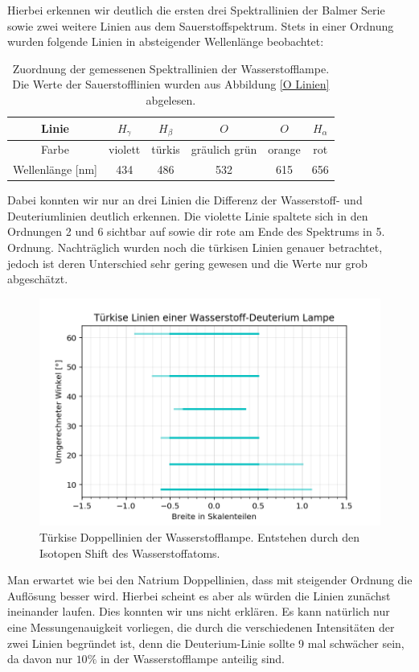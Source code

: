 \documentclass[]{article}
\begin{document}
Hierbei erkennen wir deutlich die ersten drei Spektrallinien der Balmer Serie sowie zwei weitere Linien aus dem Sauerstoffspektrum. Stets in einer Ordnung wurden folgende Linien in absteigender Wellenlänge beobachtet:

\begin{table}[H]
	\centering
	\begin{tabular}{c|c|c|c|c|c}
		Linie & $H_\gamma$ & $H_\beta$ & $O$ & $O$ & $H_\alpha$ \\
		\hline
		Farbe & violett & türkis & gräulich grün & orange & rot \\
		\hline
		Wellenlänge [nm]  & 434 & 486 & 532 & 615 & 656 \\
	\end{tabular}
	\caption{Zuordnung der gemessenen Spektrallinien der Wasserstofflampe. Die Werte der Sauerstofflinien wurden aus Abbildung \ref{O Linien} abgelesen. }
\end{table}

Dabei konnten wir nur an drei Linien die Differenz der Wasserstoff- und Deuteriumlinien deutlich erkennen. Die violette Linie spaltete sich in den Ordnungen 2 und 6 sichtbar auf sowie dir rote am Ende des Spektrums in 5. Ordnung. Nachträglich wurden noch die türkisen Linien genauer betrachtet, jedoch ist deren Unterschied sehr gering gewesen und die Werte nur grob abgeschätzt.

\begin{figure}[H]
\centering
\includegraphics[width=.7\textwidth]{Plots/HD_turkise_Linien.png}
\caption{Türkise Doppellinien der Wasserstofflampe. Entstehen durch den Isotopen Shift des Wasserstoffatoms. }
\label{fig:turkis Doppellinie}
\end{figure}

Man erwartet wie bei den Natrium Doppellinien, dass mit steigender Ordnung die Auflösung besser wird. Hierbei scheint es aber als würden die Linien zunächst ineinander laufen. Dies konnten wir uns nicht erklären. Es kann natürlich nur eine Messungenauigkeit vorliegen, die durch die verschiedenen Intensitäten der zwei Linien begründet ist, denn die Deuterium-Linie sollte 9 mal schwächer sein, da davon nur $10\%$ in der Wasserstofflampe anteilig sind.
\end{document}

